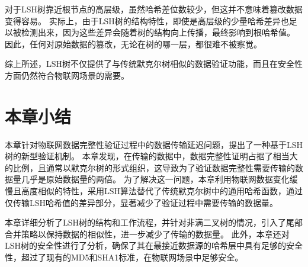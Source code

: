 对于LSH树靠近根节点的高层级，虽然哈希差位数较少，但这并不意味着篡改数据变得容易。
实际上，由于LSH树的结构特性，即使是高层级的少量哈希差异也足以被检测出来，因为这些差异会随着树的结构向上传播，最终影响到根哈希值。
因此，任何对原始数据的篡改，无论在树的哪一层，都很难不被察觉。

综上所述，LSH树不仅提供了与传统默克尔树相似的数据验证功能，而且在安全性方面仍然符合物联网场景的需要。

\section{本章小结}
本章针对物联网数据完整性验证过程中的数据传输延迟问题，提出了一种基于LSH树的新型验证机制。
本章发现，在传输的数据中，数据完整性证明占据了相当大的比例，且通常以默克尔树的形式组织，这导致为了验证数据完整性需要传输的数据量几乎是原始数据量的两倍。
为了解决这一问题，本章利用物联网数据变化缓慢且高度相似的特性，采用LSH算法替代了传统默克尔树中的通用哈希函数，通过仅传输LSH哈希值的差异部分，显著减少了验证过程中需要传输的数据量。

本章详细分析了LSH树的结构和工作流程，并针对非满二叉树的情况，引入了尾部合并策略以保持数据的相似性，进一步减少了传输的数据量。
此外，本章还对LSH树的安全性进行了分析，确保了其在最接近数据源的哈希层中具有足够的安全性，超过了现有的MD5和SHA1标准，在物联网场景中足够安全。
